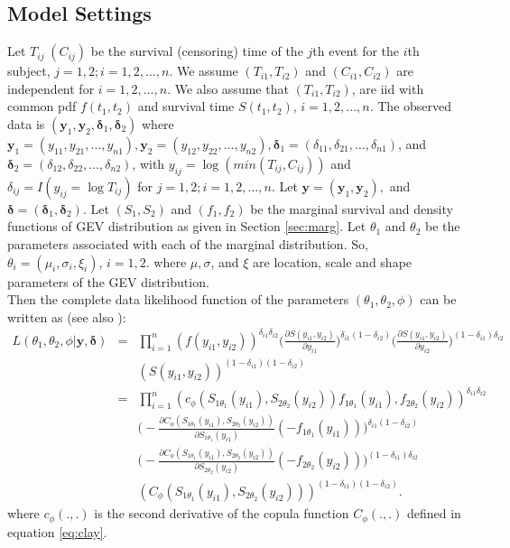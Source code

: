 \documentclass[11pt]{article}
\theoremstyle{remboldstyle}
\newcommand{\y}{{\boldsymbol{y}}}
\newcommand{\oy}{{\boldsymbol{y}_{1}}}
\newcommand{\ty}{{\boldsymbol{y}_{2}}}
\newcommand{\de}{{\boldsymbol{\delta}}}
\newcommand{\ode}{{\boldsymbol{\delta}_{1}}}
\newcommand{\tde}{{\boldsymbol{\delta}_{2}}}
\begin{document}
\subsection{Model Settings}
\noindent
Let $T_{ij}\; (C_{ij})$ be the survival (censoring) time of the $j$th
event for the $i$th subject, $j=1, 2; i=1, 2,\dots, n$. We assume
$(T_{i1}, T_{i2})$ and $(C_{i1}, C_{i2})$ are independent for
$i=1, 2,\dots, n$. We also assume that $(T_{i1}, T_{i2})$, are iid
with common pdf $f(t_1, t_2)$ and survival time $S(t_1, t_2)$, $i=1, 2,\dots, n$.
The observed data is $(\oy, \ty, \ode, \tde)$ where
$\oy=(y_{11}, y_{21},\dots,y_{n1}), \ty=(y_{12}, y_{22},\dots,y_{n2}),
\ode=(\delta_{11}, \delta_{21},\dots,\delta_{n1})$, and
$\tde=(\delta_{12}, \delta_{22},\dots, \delta_{n2})$, with $y_{ij}
= \log(min (T_{ij}, C_{ij}))$ and $\delta_{ij}= I(y_{ij} = \log T_{ij})$ for
$j=1, 2; i=1, 2,\dots, n$. Let $\y =(\oy, \ty),$ and $\de =(\ode,
\tde)$.  Let $(S_1, S_2)$ and $(f_1, f_2)$ be the marginal survival
and density functions of GEV distribution as given in Section
\ref{sec:marg}.  Let $\theta_1$ and $\theta_2$
be the parameters associated with each of the marginal distribution.
So, $\theta_i = (\mu_i, \sigma_i, \xi_i)$, $i = 1,2$. where $\mu,
\sigma$, and $\xi$ are location, scale and shape parameters of the
GEV distribution. \\ Then the complete data likelihood function  of the parameters $(\theta_1, \theta_2, \phi)$ can be written as (see also \cite{chen:2012}):
\begin{eqnarray}
  \label{eq:lik}
  L(\theta_1, \theta_2, \phi | \y, \de) &=& \prod_{i=1}^n (f(y_{i1}, y_{i2}))^{\delta_{i1} \delta_{i2}}
\Big(\frac{\partial S(y_{i1}, y_{i2})}{\partial y_{i1}}\Big)^{\delta_{i1} (1- \delta_{i2})}
\Big(\frac{\partial S(y_{i1}, y_{i2})}{\partial y_{i2}}\Big)^{(1- \delta_{i1}) \delta_{i2}}
\nonumber\\
&& (S(y_{i1}, y_{i2}))^{(1-\delta_{i1}) (1-\delta_{i2})} \nonumber\\
&=& \prod_{i=1}^n (c_\phi(S_{1 \theta_1} (y_{i1}), S_{2 \theta_2}(y_{i2})) f_{1 \theta_1}(y_{i1}), f_{2 \theta_2}(y_{i2}))^{\delta_{i1} \delta_{i2}}\nonumber\\
&&\Big(-\frac{\partial C_\phi(S_{1 \theta_1} (y_{i1}), S_{2 \theta_2}(y_{i2}))}{\partial S_{1 \theta_1} (y_{i1})}(-f_{1 \theta_1}(y_{i1}))\Big)^{\delta_{i1} (1- \delta_{i2})}\nonumber\\
&&
\Big(-\frac{\partial C_\phi(S_{1 \theta_1} (y_{i1}), S_{2 \theta_2}(y_{i2}))}{\partial S_{2 \theta_2} (y_{i2})}(-f_{2 \theta_2}(y_{i2}))\Big)^{(1-\delta_{i1})\delta_{i2}}\nonumber\\
&&
(C_\phi(S_{1 \theta_1} (y_{i1}), S_{2 \theta_2}(y_{i2})))^{(1-\delta_{i1}) (1-\delta_{i2})} .
\end{eqnarray}
where $c_{\phi}(.,.)$ is the second derivative of the copula function $C_{\phi}(.,.)$ defined in equation \ref{eq:clay}.
\end{document}
